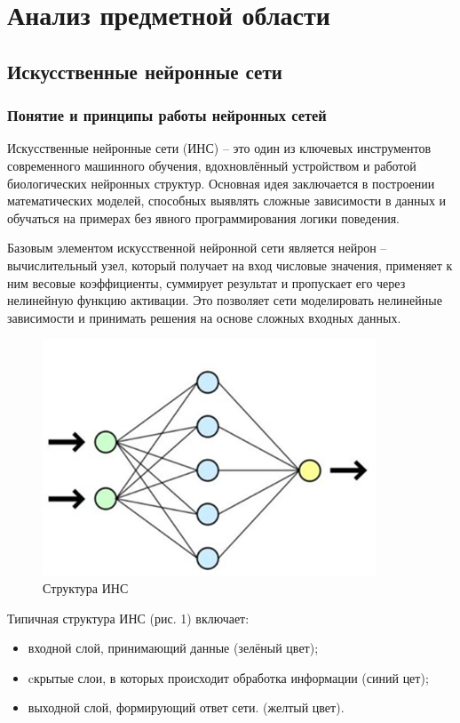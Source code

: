 \section{Анализ предметной области}
\subsection{Искусственные нейронные сети}
\subsubsection{Понятие и принципы работы нейронных сетей}

Искусственные нейронные сети (ИНС) – это один из ключевых инструментов современного машинного обучения, вдохновлённый устройством и работой биологических нейронных структур. Основная идея заключается в построении математических моделей, способных выявлять сложные зависимости в данных и обучаться на примерах без явного программирования логики поведения. 

Базовым элементом искусственной нейронной сети является нейрон – вычислительный узел, который получает на вход числовые значения, применяет к ним весовые коэффициенты, суммирует результат и пропускает его через нелинейную функцию активации. Это позволяет сети моделировать нелинейные зависимости и принимать решения на основе сложных входных данных.


\begin{figure}[H]
	\centering
	\includegraphics[width=0.7\linewidth]{images/ins}
	\caption{Структура ИНС}
	\label{fig:augexample}
\end{figure}


Типичная структура ИНС (рис. 1) включает:

\begin{itemize}
	\item входной слой, принимающий данные (зелёный цвет);
	\item cкрытые слои, в которых происходит обработка информации (синий цет);
	\item выходной слой, формирующий ответ сети. (желтый цвет).
\end{itemize}


